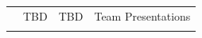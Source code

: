\documentclass[]{article}
\begin{document}
\begin{longtable}[c]{@{}rlll@{}}
\begin{minipage}[t]{0.09\columnwidth}\raggedleft
25
\end{minipage} & \begin{minipage}[t]{0.15\columnwidth}\raggedright
TBD
\end{minipage} & \begin{minipage}[t]{0.13\columnwidth}\raggedright
TBD
\end{minipage} & \begin{minipage}[t]{0.51\columnwidth}\raggedright
Team Presentations
\end{minipage}
\\\addlinespace
\bottomrule
\end{longtable}
\end{document}
